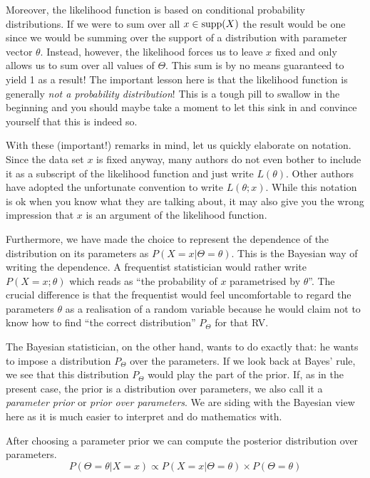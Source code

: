 Moreover, the likelihood function is based on conditional probability distributions. If we were to sum over all $ x \in \operatorname{supp}(X) $ the result would be one since 
we would be summing over the support of a distribution with parameter vector $ \theta $. Instead, however, the likelihood forces us to leave $ x $ fixed and
only allows us to sum over all values of $ \Theta $. This sum is by no means guaranteed to yield 1 as a result! The important lesson here is that the likelihood 
function is generally \emph{not a probability distribution}! This is a tough pill to swallow in the beginning and you should maybe take a moment to let this sink in
and convince yourself that this is indeed so.

With these (important!) remarks in mind, let us quickly elaborate on notation. Since the data set $ x $ is fixed anyway, many authors do not even bother to include
it as a subscript of the likelihood function and just write $ L(\theta) $. Other authors have adopted
the unfortunate convention to write $ L(\theta; x) $. While this notation is ok when you know what they are talking
about, it may also give you the wrong impression that $ x $ is an argument of the likelihood function. 

Furthermore, we have made the choice to represent the dependence of the distribution on its
parameters as $ P(X=x|\Theta=\theta) $. This is the Bayesian way of writing the dependence. A frequentist statistician would rather write $ P(X=x; \theta) $ which reads as
``the probability of $ x $ parametrised by $ \theta $''. The crucial difference is that the frequentist would feel uncomfortable to regard the parameters $ \theta $
as a realisation of a random variable because he would claim not to know how to find ``the correct distribution'' $ P_{\Theta} $ for that RV.

The Bayesian statistician, on the other hand, wants to do exactly that: he wants to impose a distribution $ P_{\Theta} $ over the parameters. 
If we look back at Bayes' rule, we see that this distribution $ P_{\Theta}$ would play the part of the prior. If, as in the present case, the prior is a distribution over parameters,
we also call it a \emph{parameter prior} or \emph{prior over parameters}. We are siding with the Bayesian view here as it is much easier to interpret and do mathematics with.

After choosing a parameter prior we can compute the posterior distribution over parameters.
\begin{equation}
P(\Theta = \theta|X =x) \propto P(X=x|\Theta = \theta) \times P(\Theta = \theta)
\end{equation}

